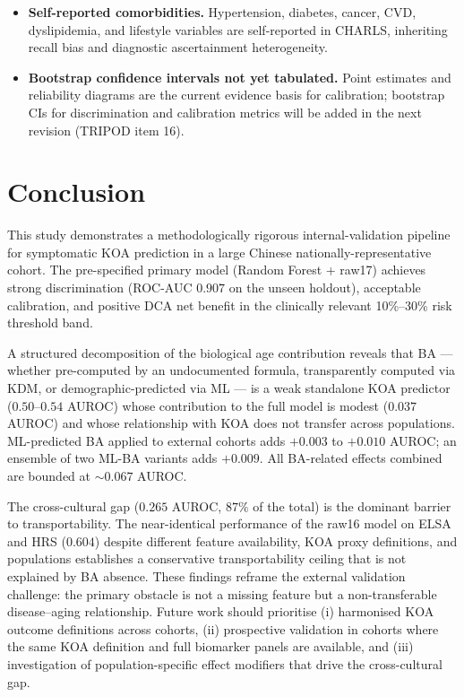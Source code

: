 \documentclass[11pt,a4paper]{article}
\begin{document}
\begin{itemize}
\item \textbf{Self-reported comorbidities.} Hypertension, diabetes, cancer, CVD,
      dyslipidemia, and lifestyle variables are self-reported in CHARLS, inheriting
      recall bias and diagnostic ascertainment heterogeneity.

\item \textbf{Bootstrap confidence intervals not yet tabulated.} Point estimates and
      reliability diagrams are the current evidence basis for calibration; bootstrap
      CIs for discrimination and calibration metrics will be added in the next
      revision (TRIPOD item 16).

\end{itemize}

\section{Conclusion}

This study demonstrates a methodologically rigorous internal-validation pipeline for
symptomatic KOA prediction in a large Chinese nationally-representative cohort. The
pre-specified primary model (Random Forest + raw17) achieves strong discrimination
(ROC-AUC $0.907$ on the unseen holdout), acceptable calibration, and positive DCA net
benefit in the clinically relevant 10\%--30\% risk threshold band.

A structured decomposition of the biological age contribution reveals that BA ---
whether pre-computed by an undocumented formula, transparently computed via KDM, or
demographic-predicted via ML --- is a weak standalone KOA predictor ($0.50$--$0.54$
AUROC) whose contribution to the full model is modest ($0.037$ AUROC) and whose
relationship with KOA does not transfer across populations. ML-predicted BA applied
to external cohorts adds $+0.003$ to $+0.010$ AUROC; an ensemble of two ML-BA
variants adds $+0.009$. All BA-related effects combined are bounded at $\sim 0.067$
AUROC.

The cross-cultural gap ($0.265$ AUROC, $87\%$ of the total) is the dominant barrier
to transportability. The near-identical performance of the raw16 model on ELSA and
HRS ($0.604$) despite different feature availability, KOA proxy definitions, and
populations establishes a conservative transportability ceiling that is not explained
by BA absence. These findings reframe the external validation challenge: the primary
obstacle is not a missing feature but a non-transferable disease--aging relationship.
Future work should prioritise (i) harmonised KOA outcome definitions across cohorts,
(ii) prospective validation in cohorts where the same KOA definition and full
biomarker panels are available, and (iii) investigation of population-specific
effect modifiers that drive the cross-cultural gap.
\end{document}
